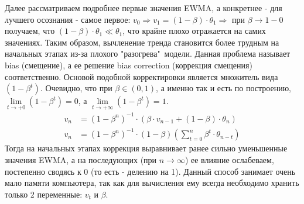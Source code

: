 			Далее рассматриваем подробнее первые значения EWMA, а конкретнее - для лучшего осознания - самое первое: $v_0 \Rightarrow v_1 = (1 - \beta) \cdot \theta_1 \Rightarrow$ при $\beta \to 1 - 0$ получаем, что $(1 - \beta) \cdot \theta_1 \ll \theta_1$, что крайне плохо отражается на самих значениях. Таким образом, вычленение тренда становится более трудным на начальных этапах из-за плохого "разогрева"\ модели. Данная проблема называет bias (смещение), а ее решение bias correction (коррекция смещения) соответственно. Основой подобной корректировки является множитель вида $(1 - \beta^t)$. Очевидно, что при $\beta \in (0,1)$, а именно так и есть по построению, $\lim\limits_{t \to +0}(1 - \beta^t) = 0$, а $\lim\limits_{t \to +\infty}(1 - \beta^t) = 1$.
			\begin{equation}
				\begin{split}
					v_n & = (1 - \beta^n)^{-1} \cdot (\beta \cdot v_{n - 1} + (1 - \beta) \cdot \theta_n)\\
					v_n & = (1 - \beta^n)^{-1} \cdot (1 - \beta) \left(\sum_{t = 0}^n \beta^t \cdot \theta_{n - t}\right)
				\end{split}
			\end{equation}
			Тогда на начальных этапах коррекция выравнивает ранее сильно уменьшенные значения EWMA, а на последующих (при $n \to \infty$) ее влияние ослабеваем, постепенно сводясь к 0 (то есть - делению на 1). Данный способ занимает очень мало памяти компьютера, так как для вычисления ему всегда необходимо хранить только 2 переменные: $v_t$ и $\beta$.
			
